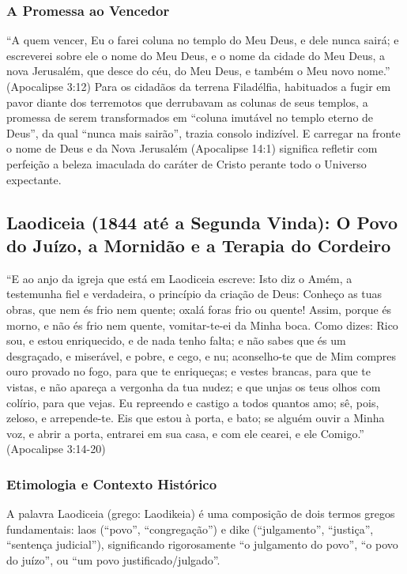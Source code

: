 \subsubsection*{A Promessa ao Vencedor}
``A quem vencer, Eu o farei coluna no templo do Meu Deus, e dele nunca sairá; e escreverei sobre ele o nome do Meu Deus, e o nome da cidade do Meu Deus, a nova Jerusalém, que desce do céu, do Meu Deus, e também o Meu novo nome.'' (Apocalipse 3:12)
Para os cidadãos da terrena Filadélfia, habituados a fugir em pavor diante dos terremotos que derrubavam as colunas de seus templos, a promessa de serem transformados em ``coluna imutável no templo eterno de Deus'', da qual ``nunca mais sairão'', trazia consolo indizível. E carregar na fronte o nome de Deus e da Nova Jerusalém (Apocalipse 14:1) significa refletir com perfeição a beleza imaculada do caráter de Cristo perante todo o Universo expectante.



\subsection{Laodiceia (1844 até a Segunda Vinda): O Povo do Juízo, a Mornidão e a Terapia do Cordeiro}


``E ao anjo da igreja que está em Laodiceia escreve: Isto diz o Amém, a testemunha fiel e verdadeira, o princípio da criação de Deus: Conheço as tuas obras, que nem és frio nem quente; oxalá foras frio ou quente! Assim, porque és morno, e não és frio nem quente, vomitar-te-ei da Minha boca. Como dizes: Rico sou, e estou enriquecido, e de nada tenho falta; e não sabes que és um desgraçado, e miserável, e pobre, e cego, e nu; aconselho-te que de Mim compres ouro provado no fogo, para que te enriqueças; e vestes brancas, para que te vistas, e não apareça a vergonha da tua nudez; e que unjas os teus olhos com colírio, para que vejas. Eu repreendo e castigo a todos quantos amo; sê, pois, zeloso, e arrepende-te. Eis que estou à porta, e bato; se alguém ouvir a Minha voz, e abrir a porta, entrarei em sua casa, e com ele cearei, e ele Comigo.'' (Apocalipse 3:14-20)


\subsubsection*{Etimologia e Contexto Histórico}
A palavra Laodiceia (grego: Laodikeia) é uma composição de dois termos gregos fundamentais: laos (``povo'', ``congregação'') e dike (``julgamento'', ``justiça'', ``sentença judicial''), significando rigorosamente ``o julgamento do povo'', ``o povo do juízo'', ou ``um povo justificado/julgado''.

